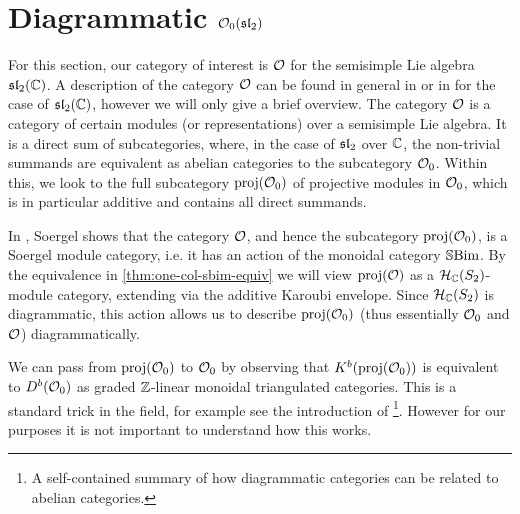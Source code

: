 \section{Diagrammatic $\mathcal{O}_0(\operatorname{\mathfrak{sl}}_2)$}


For this section, our category of interest is $\mathcal{O}$ for the semisimple Lie algebra $\operatorname{\mathfrak{sl}}_2(\mathbb{C})$. A description of the category $\mathcal{O}$ can be found in general in {\cite[Sections 3.8--3.10]{humphreys-category-O}} or in {\cite[Section 5.2]{mazorchuk-lectures-sl2-modules}} for the case of $\operatorname{\mathfrak{sl}}_2(\mathbb{C})$, however we will only give a brief overview. The category $\mathcal{O}$ is a category of certain modules (or representations) over a semisimple Lie algebra. It is a direct sum of subcategories, where, in the case of $\operatorname{\mathfrak{sl}}_2$ over $\mathbb{C}$, the non-trivial summands are equivalent as abelian categories to the subcategory $\mathcal{O}_0$. Within this, we look to the full subcategory $\operatorname{proj}(\mathcal{O}_0)$ of projective modules in $\mathcal{O}_0$, which is in particular additive and contains all direct summands.

In \cite[Section 2.4]{soergel-category-O}, Soergel shows that the category $\mathcal{O}$, and hence the subcategory $\operatorname{proj}(\mathcal{O}_0)$, is a Soergel module category, i.e. it has an action of the monoidal category $\operatorname{\mathbb{S}Bim}$. By the equivalence in \autoref{thm:one-col-sbim-equiv} we will view $\operatorname{proj}(\mathcal{O})$ as a $\mathcal{H}_{\mathbb{C}}(S_2)$-module category, extending via the additive Karoubi envelope. Since $\mathcal{H}_{\mathbb{C}}(S_2)$ is diagrammatic, this action allows us to describe $\operatorname{proj}(\mathcal{O}_0)$ (thus essentially $\mathcal{O}_0$ and $\mathcal{O}$) diagrammatically.

\begin{remark}
    \label{rk:projO_0-to-O_0}
    We can pass from $\operatorname{proj}(\mathcal{O}_0)$ to $\mathcal{O}_0$ by observing that $K^b(\operatorname{proj}(\mathcal{O}_0))$ is equivalent to $D^b(\mathcal{O}_0)$ as graded $\mathbb{Z}$-linear  monoidal triangulated categories. This is a standard trick in the field, for example see the introduction of \cite{riche-williamson-tilt-modules-p-canon-basis}\footnote{A self-contained summary of how diagrammatic categories can be related to abelian categories.}. However for our purposes it is not important to understand how this works.
\end{remark}


